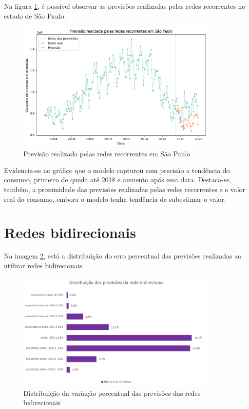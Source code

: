 Na figura \ref{img:consumo-sp-rnn}, é possível observar as previsões realizadas pelas 
redes recorrentes no estado de São Paulo.

\begin{figure}[H]
    \centering
    \includegraphics[width=10cm]{../figuras/graficos/rnn/prev_sp.png}
    \caption{Previsão realizada pelas redes recorrentes em São Paulo}
    \label{img:consumo-sp-rnn}
\end{figure}

Evidencia-se no gráfico que o modelo capturou com precisão a tendência do 
consumo, primeiro de queda até 2018 e aumento após essa data. Destaca-se, 
também, a proximidade das previsões realizadas pelas redes recorrentes e o 
valor real do consumo, embora o modelo tenha tendência de subestimar o valor.


\section{Redes bidirecionais}

Na imagem \ref{img:erro-perc-bnn}, está a distribuição do erro percentual das 
previsões realizadas ao utilizar redes bidirecionais. 

\begin{figure}[H] 
    \centering
    \includegraphics[width=10cm]{../figuras/graficos/bi/erro-perc-bi.png}
    \caption{Distribuição da variação percentual das previsões das redes bidirecionais}
    \label{img:erro-perc-bnn}
\end{figure}

